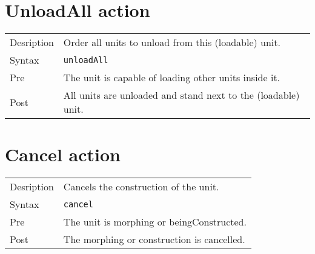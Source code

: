 \section{UnloadAll action}
\begin{tabularx}{\textwidth}{lX}
 Desription & Order all units to unload from this (loadable) unit. \\
 Syntax & \verb|unloadAll| \\
 Pre & The unit is capable of loading other units inside it. \\
 Post & All units are unloaded and stand next to the (loadable) unit.
\end{tabularx}

\section{Cancel action}
\begin{tabularx}{\textwidth}{lX}
 Desription & Cancels the construction of the unit. \\
 Syntax & \verb|cancel| \\
 Pre & The unit is morphing or beingConstructed. \\
 Post & The morphing or construction is cancelled.
\end{tabularx}

